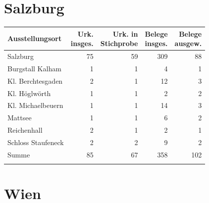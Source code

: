 
\section{Salzburg}

\begin{tabularx}{\linewidth}{X r r r r}
\lsptoprule
Ausstellungsort
	& \makecell{Urk.\\ insges.}
	& \makecell{Urk. in\\ Stichprobe}
	& \makecell{Belege\\ insges.}
	& \makecell{Belege\\ ausgew.}
	\\
\midrule

Salzburg
	& 75
	& 59
	& 309
	& 88
	\\

Burgstall Kalham
	& 1
	& 1
	& 4
	& 1
	\\

Kl. Berchtesgaden
	& 2
	& 1
	& 12
	& 3
	\\

Kl. Höglwörth
	& 1
	& 1
	& 2
	& 2
	\\

Kl. Michaelbeuern
	& 1
	& 1
	& 14
	& 3
	\\

Mattsee
	& 1
	& 1
	& 6
	& 2
	\\

Reichenhall
	& 2
	& 1
	& 2
	& 1
	\\

Schloss Staufeneck
	& 2
	& 2
	& 9
	& 2
	\\

\midrule

Summe
	& 85
	& 67
	& 358
	& 102
	\\

\lspbottomrule
\end{tabularx}


\section{Wien}

